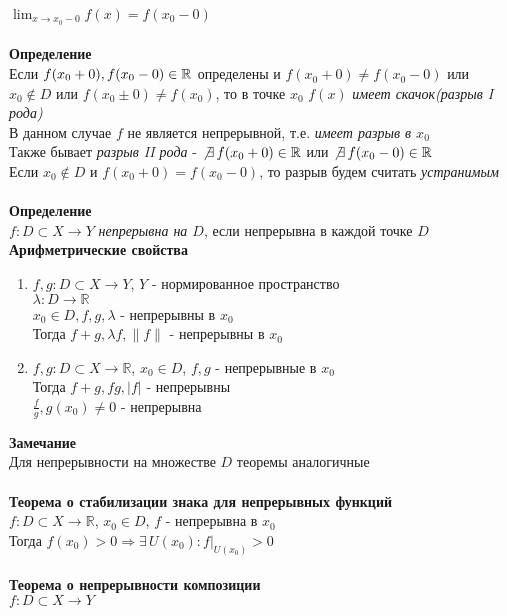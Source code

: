 \documentclass[12pt]{article}
\begin{document}
$\lim_{x\rightarrow x_0-0} f(x) = f(x_0-0)$\\\\
\textbf{Определение}\\
Если $f(x_0+0), f(x_0-0) \in \mathbb{R}$ определены и $f(x_0+0) \neq f(x_0-0)$ или $x_0 \not\in D$ или $f(x_0\pm0) \neq f(x_0)$, то в точке $x_0$ $f(x)$ \textit{имеет скачок(разрыв I рода)}\\
В данном случае $f$ не является непрерывной, т.е. \textit{имеет разрыв в $x_0$}\\
Также бывает \textit{разрыв II рода} - $\not\exists\,f(x_0+0) \in \mathbb{R}$ или $\not\exists\,f(x_0-0) \in \mathbb{R}$\\
Если $x_0 \notin D$ и $f(x_0+0) = f(x_0-0)$, то разрыв будем считать \textit{устранимым}\\\\
\textbf{Определение}\\
$f:D\subset X \rightarrow Y$ \textit{непрерывна на $D$}, если непрерывна в каждой точке $D$\\
\textbf{Арифметрические свойства}
\begin{enumerate}
    \item $f,g: D\subset X \rightarrow Y$, $Y$ - нормированное пространство\\
    $\lambda:D \rightarrow \mathbb{R}$\\
    $x_0\in D, f,g,\lambda$ - непрерывны в $x_0$\\
    Тогда $f+g,\lambda f, \|f\|$ - непрерывны в $x_0$
    \item $f,g: D\subset X \rightarrow \mathbb{R}$, $x_0\in D$, $f,g$ - непрерывные в $x_0$\\
    Тогда $f+g, fg, |f|$ - непрерывны\\
    $\frac{f}{g}, g(x_0) \neq 0$ - непрерывна\\ 
\end{enumerate}
\textbf{Замечание}\\
Для непрерывности на множестве $D$ теоремы аналогичные\\\\
\textbf{Теорема о стабилизации знака для непрерывных функций}\\
$f:D\subset X \rightarrow \mathbb{R}$, $x_0 \in D$, $f$ - непрерывна в $x_0$\\
Тогда $f(x_0) > 0 \Rightarrow \exists\,U(x_0): f|_{U(x_0)} > 0$\\\\
\textbf{Теорема о непрерывности композиции}\\
$f:D\subset X \rightarrow Y$\\
\end{document}
